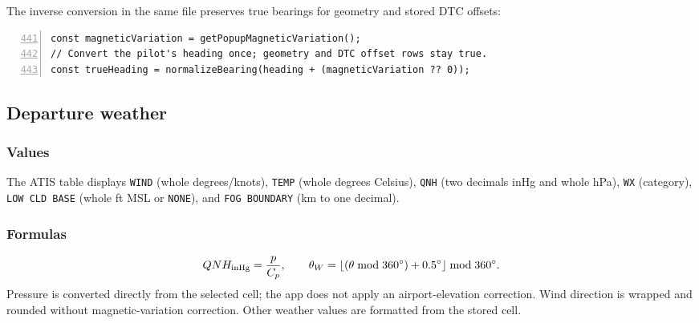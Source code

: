 \documentclass[10pt,a4paper]{amsart}
\begin{document}
The inverse conversion in the same file preserves true bearings
for geometry and stored DTC offsets:
\begin{lstlisting}[numbers=left,firstnumber=441,numberstyle=\tiny,xleftmargin=2em]
const magneticVariation = getPopupMagneticVariation();
// Convert the pilot's heading once; geometry and DTC offset rows stay true.
const trueHeading = normalizeBearing(heading + (magneticVariation ?? 0));
\end{lstlisting}

\subsection{Departure weather}\label{subsec:departure-weather}
\subsubsection*{Values}
The ATIS table displays \texttt{WIND} (whole degrees/knots),
\texttt{TEMP} (whole degrees Celsius), \texttt{QNH}
(two decimals inHg and whole hPa), \texttt{WX} (category),
\texttt{LOW CLD BASE} (whole ft MSL or \texttt{NONE}), and
\texttt{FOG BOUNDARY} (km to one decimal).

\subsubsection*{Formulas}
\[
 QNH_{\rm inHg}=\frac{p}{C_p},\qquad
 \theta_W=\lfloor(\theta\bmod360^\circ)+0.5^\circ\rfloor
               \bmod360^\circ.
\]
Pressure is converted directly from the selected cell; the app
does not apply an airport-elevation correction. Wind direction
is wrapped and rounded without magnetic-variation correction.
Other weather values are formatted from the stored cell.
\end{document}
